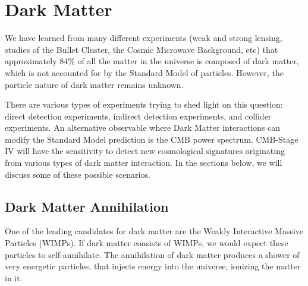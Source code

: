 %
%
%
%
%



\section{Dark Matter}


We have learned from many different experiments (weak and strong lensing, studies of the Bullet Cluster, the Cosmic Microwave Background, etc) that approximately $84\%$ of all the matter in the universe is composed of dark matter, which is not accounted for by the Standard Model of particles. However, the particle nature of dark matter remains unknown.

There are various types of experiments trying to shed light on this question: direct detection experiments, indirect detection experiments, and collider experiments. 
An alternative observable where Dark Matter interactions can modify the Standard Model prediction is the CMB power spectrum.
CMB-Stage IV will have the sensitivity to detect new cosmological signatures originating from various types of dark matter interaction. In the sections below, we will discuss some of these possible scenarios.

\subsection{Dark Matter Annihilation}

One of the leading candidates for dark matter are the Weakly Interactive Massive Particles (WIMPs). If dark matter consists of WIMPs, we would expect these particles to self-annihilate. The annihilation of dark matter produces a shower of very energetic particles, that injects energy into the universe, ionizing the matter in it.

